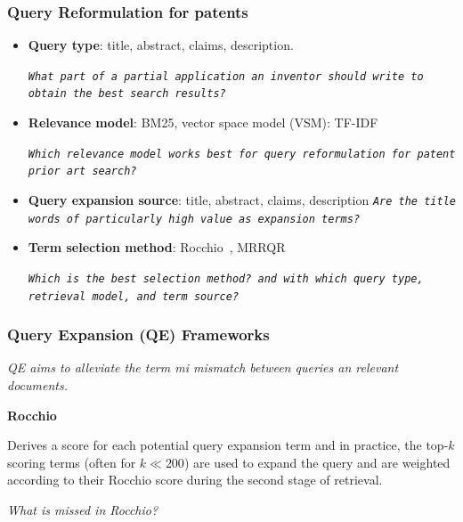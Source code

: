 \documentclass[xcolor=x11names,compress]{beamer}
\renewcommand{\(}{\begin{columns}}
\renewcommand{\)}{\end{columns}}
\newcommand{\<}[1]{\begin{column}{#1}}
\renewcommand{\>}{\end{column}}
\begin{document}
\begin{frame}
\frametitle{Query Reformulation for patents}

\begin{itemize}
\item {\color{DeepSkyBlue4}\textbf{Query type}}: title, abstract, claims, description.

{\small \textit{\texttt{What part of a partial application an inventor
should write to obtain the best search results?}}}

\item {\color{DeepSkyBlue4}\textbf{Relevance model}}: BM25, vector space model (VSM): TF-IDF~\cite{Salton1975}

{\small \textit{\texttt{Which relevance model works best for query reformulation
for patent prior art search? }}}

\item {\color{DeepSkyBlue4}\textbf{Query expansion source}}:  title, abstract,
claims, description
{\small \texttt{\textit{Are the title words of particularly high value as expansion terms? }}}

\item {\color{DeepSkyBlue4}\textbf{Term selection method}}: Rocchio~\cite{Salton1971}, 
MRRQR 

{\small \textit{\texttt{Which is the best selection method? and with which query type, retrieval model, and term source? }}}
\end{itemize}
\end{frame}


\begin{frame}
\frametitle{Query Expansion (QE) Frameworks}

{\color{DeepSkyBlue4}\textit{QE aims to alleviate the term mi mismatch between queries an relevant documents.}}

\textbf{Rocchio} 

Derives a score for each potential query expansion term and in practice, the top-$k$ scoring terms (often for $k\ll200$) are used to expand the query and are
weighted according to their Rocchio score during the second stage
of retrieval. 

\textit{What is missed in Rocchio?}
\end{frame}
\end{document}
